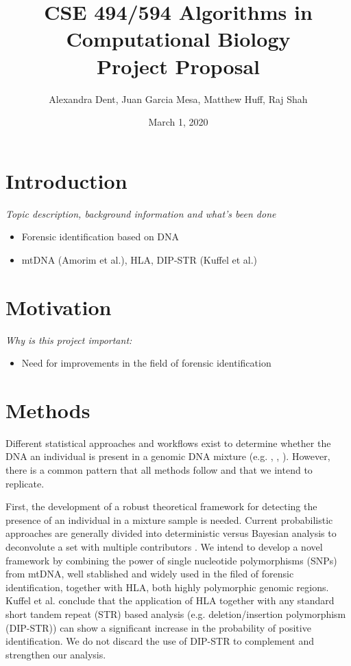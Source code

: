 \documentclass[10pt]{article}
\title{CSE 494/594 Algorithms in Computational Biology \\
		Project Proposal}
\author{Alexandra Dent, Juan Garcia Mesa, Matthew Huff, Raj Shah}
\date{March 1, 2020}
\begin{document}
\maketitle

\section{Introduction}
\textit{Topic description, background information and what's been done}

\begin{itemize}
	\item Forensic identification based on DNA
	\item mtDNA (Amorim et al.), HLA, DIP-STR (Kuffel et al.) 
\end{itemize}

\section{Motivation}
\textit{Why is this project important:}

\begin{itemize}
	\item Need for improvements in the field of forensic identification
\end{itemize}



\section{Methods}

Different statistical approaches and workflows exist to determine whether the DNA an individual is present in a genomic DNA mixture (e.g. \cite{Cowell2015}, \cite{Homer2008}, \cite{Vohr2015}). However, there is a common pattern that all methods follow and that we intend to replicate. 

First, the development of a robust theoretical framework for detecting the presence of an individual in a mixture sample is needed. Current probabilistic approaches are generally divided into deterministic versus Bayesian analysis to deconvolute a set with multiple contributors \cite{Hu2014}. We intend to develop a novel framework by combining the power of single nucleotide polymorphisms (SNPs) from mtDNA, well stablished and widely used in the filed of forensic identification, together with HLA, both highly polymorphic genomic regions. Kuffel et al. \cite{Kuffel2019} conclude that the application of HLA together with any standard short tandem repeat (STR) based analysis (e.g. deletion/insertion polymorphism (DIP-STR)) can show a significant increase in the probability of positive identification. We do not discard the use of DIP-STR to complement and strengthen our analysis.
\end{document}
